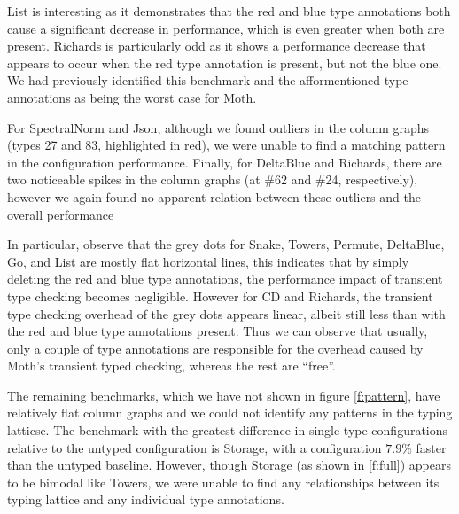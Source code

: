 \documentclass[sigplan,10pt,review,screen]{acmart}\settopmatter{printfolios=true}
\begin{document}
List is interesting as it demonstrates that the red and blue type annotations both cause a significant decrease in performance, which is even greater when both are present. Richards is particularly odd as it shows a performance decrease that appears to occur when the red type annotation is present, but not the blue one. We had previously identified this benchmark and the afformentioned type annotations \cite{roberts-and-co-ecoop-2019} as being the worst case for Moth.

For SpectralNorm and Json, although we found outliers in the column graphs (types 27 and 83, highlighted in red), we were unable to find a matching pattern in the configuration performance.
Finally, for DeltaBlue and Richards, there are two noticeable spikes in the column graphs (at \#62 and \#24, respectively), however we again found no apparent relation between these outliers and the overall performance

In particular, observe that the grey dots for Snake, Towers, Permute, DeltaBlue, Go, and List are mostly flat horizontal lines, this indicates that by simply deleting the red and blue type annotations, the performance impact of transient type checking becomes negligible. However for CD and Richards, the transient type checking overhead of the grey dots appears linear, albeit still less than with the red and blue type annotations present. Thus we can observe that usually, only a couple of type annotations are responsible for the overhead caused by Moth's transient typed checking, whereas the rest are ``free''.

The remaining benchmarks, which we have not shown in figure \ref{f:pattern}, have relatively flat column graphs and we could not identify any patterns in the typing latticse. The benchmark with the greatest difference in single-type configurations relative to the untyped configuration is Storage, with a configuration $7.9\%$ faster than the untyped baseline. However, though Storage (as shown in \ref{f:full}) appears to be bimodal like Towers, we were unable to find any relationships between its typing lattice and any individual type annotations.
\end{document}
